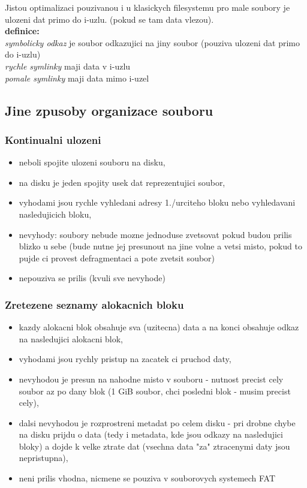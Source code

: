 \documentclass[a4paper, 11pt]{article}
\begin{document}
Jistou optimalizaci pouzivanou i u klasickych filesystemu pro male soubory je ulozeni dat primo do i-uzlu. (pokud se tam data vlezou). \\

\textbf{definice:} \\[0.5em]
\textit{symbolicky odkaz} je soubor odkazujici na jiny soubor (pouziva ulozeni dat primo do i-uzlu) \\[0.2em]
\textit{rychle symlinky} maji data v i-uzlu \\[0.2em]
\textit{pomale symlinky} maji data mimo i-uzel

\newpage

\subsection{Jine zpusoby organizace souboru}
\subsubsection{Kontinualni ulozeni}
\begin{itemize}
    \item neboli spojite ulozeni souboru na disku,
    \item na disku je jeden spojity usek dat reprezentujici soubor,
    \item vyhodami jsou rychle vyhledani adresy 1./urciteho bloku nebo vyhledavani nasledujicich bloku,
    \item nevyhody: soubory nebude mozne jednoduse zvetsovat pokud budou prilis blizko u sebe (bude nutne jej presunout na jine volne a vetsi misto, pokud to pujde ci provest defragmentaci a pote zvetsit soubor)
    \item nepouziva se prilis (kvuli sve nevyhode) \\
\end{itemize}

\subsubsection{Zretezene seznamy alokacnich bloku}
\begin{itemize}
    \item kazdy alokacni blok obsahuje sva (uzitecna) data a na konci obsahuje odkaz na nasledujici alokacni blok,
    \item vyhodami jsou rychly pristup na zacatek ci pruchod daty,
    \item nevyhodou je presun na nahodne misto v souboru - nutnost precist cely soubor az po dany blok (1 GiB soubor, chci posledni blok - musim precist cely),
    \item dalsi nevyhodou je rozprostreni metadat po celem disku - pri drobne chybe na disku prijdu o data (tedy i metadata, kde jsou odkazy na nasledujici bloky) a dojde k velke ztrate dat (vsechna data "za" ztracenymi daty jsou nepristupna),
    \item neni prilis vhodna, nicmene se pouziva v souborovych systemech FAT \\
\end{itemize}
\end{document}
